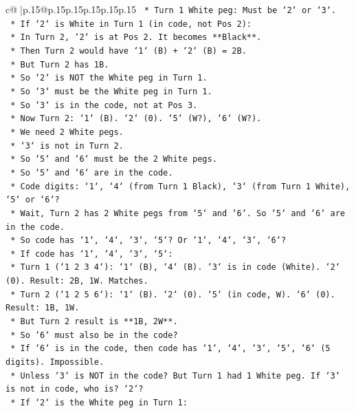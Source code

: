 \documentclass{article}
\begin{document}
{\begin{supertabular}{c@{$\;$}|p{.15\linewidth}@{}p{.15\linewidth}p{.15\linewidth}p{.15\linewidth}p{.15\linewidth}p{.15\linewidth}}
{{{\texttt{    *   Turn 1 White peg: Must be `2` or `3`.} \\
\texttt{    *   If `2` is White in Turn 1 (in code, not Pos 2):} \\
\texttt{        *   In Turn 2, `2` is at Pos 2. It becomes **Black**.} \\
\texttt{        *   Then Turn 2 would have `1` (B) + `2` (B) = 2B.} \\
\texttt{        *   But Turn 2 has 1B.} \\
\texttt{        *   So `2` is NOT the White peg in Turn 1.} \\
\texttt{    *   So `3` must be the White peg in Turn 1.} \\
\texttt{    *   So `3` is in the code, not at Pos 3.} \\
\texttt{    *   Now Turn 2: `1` (B). `2` (0). `5` (W?), `6` (W?).} \\
\texttt{    *   We need 2 White pegs.} \\
\texttt{    *   `3` is not in Turn 2.} \\
\texttt{    *   So `5` and `6` must be the 2 White pegs.} \\
\texttt{    *   So `5` and `6` are in the code.} \\
\texttt{    *   Code digits: `1`, `4` (from Turn 1 Black), `3` (from Turn 1 White), `5` or `6`?} \\
\texttt{    *   Wait, Turn 2 has 2 White pegs from `5` and `6`. So `5` and `6` are in the code.} \\
\texttt{    *   So code has `1`, `4`, `3`, `5`? Or `1`, `4`, `3`, `6`?} \\
\texttt{    *   If code has `1`, `4`, `3`, `5`:} \\
\texttt{        *   Turn 1 (`1 2 3 4`): `1` (B), `4` (B). `3` is in code (White). `2` (0). Result: 2B, 1W. Matches.} \\
\texttt{        *   Turn 2 (`1 2 5 6`): `1` (B). `2` (0). `5` (in code, W). `6` (0). Result: 1B, 1W.} \\
\texttt{        *   But Turn 2 result is **1B, 2W**.} \\
\texttt{        *   So `6` must also be in the code?} \\
\texttt{        *   If `6` is in the code, then code has `1`, `4`, `3`, `5`, `6` (5 digits). Impossible.} \\
\texttt{        *   Unless `3` is NOT in the code? But Turn 1 had 1 White peg. If `3` is not in code, who is? `2`?} \\
\texttt{        *   If `2` is the White peg in Turn 1:} \\
}}}
\end{supertabular}}
\end{document}
